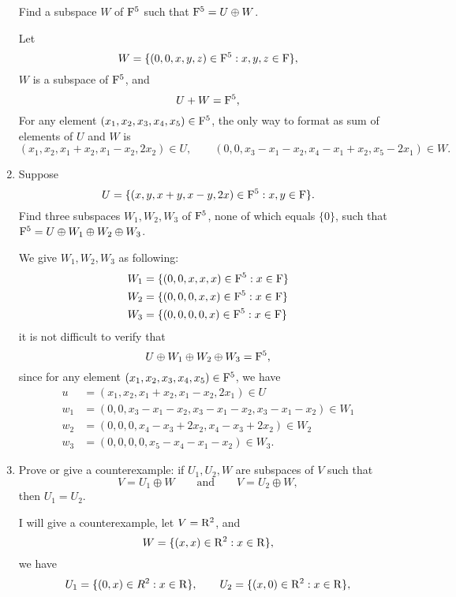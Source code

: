 \begin{enumerate}
        Find a subspace $W$ of $\mathrm{F}^5$ such that $\mathrm{F}^5 = U \oplus W$.
        \begin{solution}
            Let 
            \[ W = \{(0,0,x,y,z) \in \mathrm{F}^5: x,y,z \in \mathrm{F}\},\]
            $W$ is a subspace of $\mathrm{F}^5$, and 
            \[ U + W = \mathrm{F}^5 ,\]
            For any element $(x_1, x_2, x_3, x_4, x_5) \in \mathrm{F}^5$, the only way to format as sum of 
            elements of $U$ and $W$ is 
            \[ (x_1, x_2, x_1+x_2, x_1-x_2,2x_2) \in U, \qquad (0, 0, x_3-x_1-x_2, x_4-x_1+x_2, x_5-2x_1)\in W.\]
        \end{solution}
    \item Suppose 
        \[ U = \{(x,y,x+y,x-y,2x) \in \mathrm{F}^5: x,y \in \mathrm{F}\}.\]
        Find three subspaces $W_1,W_2,W_3$ of $\mathrm{F}^5$, none of which equals $\{0\}$, 
        such that $\mathrm{F}^5 = U \oplus W_1 \oplus W_2 \oplus W_3$.
        \begin{solution}
            We give $W_1, W_2, W_3$ as following:
            \begin{align*}
                W_1 &= \{(0,0,x,x,x) \in \mathrm{F}^5: x \in \mathrm{F}\}\\
                W_2 &= \{(0,0,0,x,x) \in \mathrm{F}^5: x \in \mathrm{F}\}\\
                W_3 &= \{(0,0,0,0,x) \in \mathrm{F}^5: x \in \mathrm{F}\}
            \end{align*}
            it is not difficult to verify that 
            \[ U \oplus W_1 \oplus W_2 \oplus W_3 = \mathrm{F}^5,\]
            since for any element $(x_1, x_2, x_3, x_4, x_5) \in \mathrm{F}^5$, we have 
            \begin{align*}
                u &= (x_1, x_2, x_1+x_2, x_1 - x_2, 2x_1) \in U \\
                w_1 &= (0,0,x_3-x_1-x_2,x_3-x_1-x_2,x_3-x_1-x_2) \in W_1 \\
                w_2 &= (0,0,0,x_4-x_3+2x_2, x_4-x_3+2x_2) \in W_2 \\
                w_3 &= (0,0,0,0,x_5-x_4-x_1-x_2) \in W_3.
            \end{align*}
        \end{solution}
    \item Prove or give a counterexample: if $U_1, U_2, W$ are subspaces of $V$ such that 
        \[ V = U_1 \oplus W \qquad \text{and} \qquad V = U_2 \oplus W,\]
        then $U_1 = U_2$.
        \begin{solution}
            I will give a counterexample, let $V = \mathrm{R}^2$, and 
            \[ W = \{(x,x) \in \mathrm{R}^2: x \in \mathrm{R}\},\]
            we have 
            \[ U_1 = \{(0,x)\in R^2:x\in\mathrm{R}\}, \qquad U_2 =\{(x,0)\in \mathrm{R}^2: x \in \mathrm{R}\},\]

\end{solution}
\end{enumerate}
